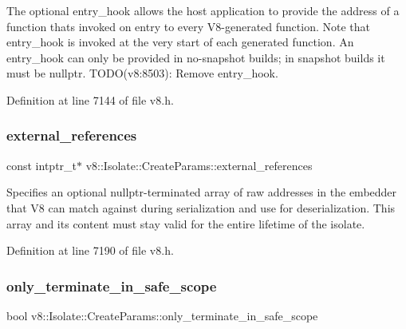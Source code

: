 The optional entry\+\_\+hook allows the host application to provide the address of a function that\textquotesingle{}s invoked on entry to every V8-\/generated function. Note that entry\+\_\+hook is invoked at the very start of each generated function. An entry\+\_\+hook can only be provided in no-\/snapshot builds; in snapshot builds it must be nullptr. T\+O\+D\+O(v8\+:8503)\+: Remove entry\+\_\+hook. 

Definition at line 7144 of file v8.\+h.

\mbox{\label{structv8_1_1Isolate_1_1CreateParams_a89b8c9dc74efbdcd93ab5786eae6fe19}} 
\subsubsection{\texorpdfstring{external\+\_\+references}{external\_references}}
{\footnotesize\ttfamily const intptr\+\_\+t$\ast$ v8\+::\+Isolate\+::\+Create\+Params\+::external\+\_\+references}

Specifies an optional nullptr-\/terminated array of raw addresses in the embedder that V8 can match against during serialization and use for deserialization. This array and its content must stay valid for the entire lifetime of the isolate. 

Definition at line 7190 of file v8.\+h.

\mbox{\label{structv8_1_1Isolate_1_1CreateParams_af44a854a07944452589128b6cf3b9958}} 
\subsubsection{\texorpdfstring{only\+\_\+terminate\+\_\+in\+\_\+safe\+\_\+scope}{only\_terminate\_in\_safe\_scope}}
{\footnotesize\ttfamily bool v8\+::\+Isolate\+::\+Create\+Params\+::only\+\_\+terminate\+\_\+in\+\_\+safe\+\_\+scope}


